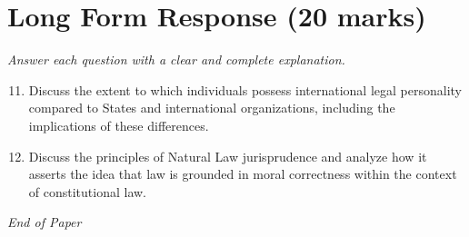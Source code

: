 \documentclass[12pt]{article}
\begin{document}
\section*{Long Form Response (20 marks)}
\textit{Answer each question with a clear and complete explanation.}
\begin{enumerate}[label=\arabic*.]
\setcounter{enumi}{10}
\item Discuss the extent to which individuals possess international legal personality compared to States and international organizations, including the implications of these differences.
\item Discuss the principles of Natural Law jurisprudence and analyze how it asserts the idea that law is grounded in moral correctness within the context of constitutional law.
\end{enumerate}

\vfill
\noindent\textit{End of Paper}
\end{document}
